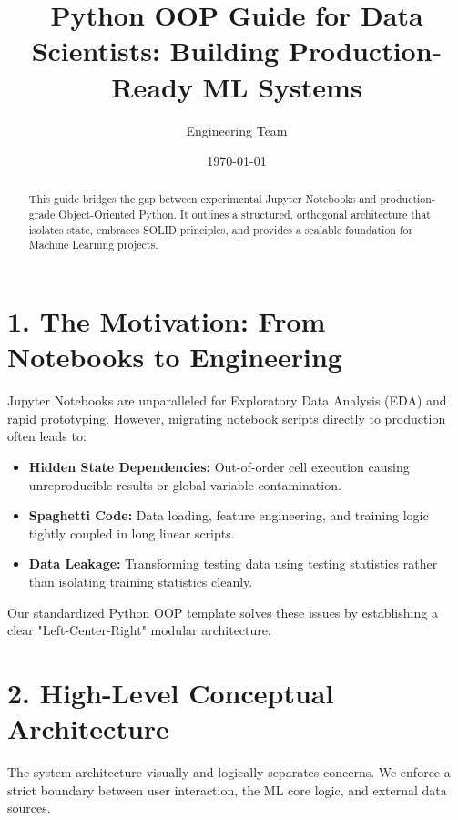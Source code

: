 \documentclass{modern-c4}
\title{Python OOP Guide for Data Scientists: Building Production-Ready ML Systems}
\author{Engineering Team}
\date{\today}
\begin{document}
\maketitle

\begin{abstract}
This guide bridges the gap between experimental Jupyter Notebooks and production-grade Object-Oriented Python. It outlines a structured, orthogonal architecture that isolates state, embraces SOLID principles, and provides a scalable foundation for Machine Learning projects.
\end{abstract}

\section{1. The Motivation: From Notebooks to Engineering}
Jupyter Notebooks are unparalleled for Exploratory Data Analysis (EDA) and rapid prototyping. However, migrating notebook scripts directly to production often leads to:
\begin{itemize}
    \item \textbf{Hidden State Dependencies:} Out-of-order cell execution causing unreproducible results or global variable contamination.
    \item \textbf{Spaghetti Code:} Data loading, feature engineering, and training logic tightly coupled in long linear scripts.
    \item \textbf{Data Leakage:} Transforming testing data using testing statistics rather than isolating training statistics cleanly.
\end{itemize}
Our standardized Python OOP template solves these issues by establishing a clear "Left-Center-Right" modular architecture.

\section{2. High-Level Conceptual Architecture}
The system architecture visually and logically separates concerns. We enforce a strict boundary between user interaction, the ML core logic, and external data sources.
\end{document}
